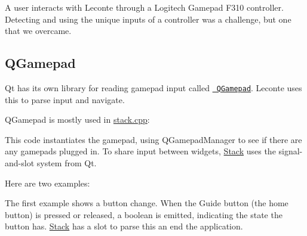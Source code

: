 A user interacts with Leconte through a Logitech Gamepad F310 controller. Detecting and using the unique inputs of a controller was a challenge, but one that we overcame.

\subsection*{Q\+Gamepad}

Qt has its own library for reading gamepad input called \href{https://doc.qt.io/qt-5/qgamepad.html}{\texttt{ Q\+Gamepad}}. Leconte uses this to parse input and navigate.

Q\+Gamepad is mostly used in {\ttfamily \mbox{\hyperlink{stack_8cpp}{stack.\+cpp}}}\+: 
\begin{DoxyCode}{0}
\DoxyCodeLine{\textcolor{preprocessor}{\#include <QtGamepad/QGamepad>}}
\DoxyCodeLine{    \textcolor{keywordflow}{return};}
\DoxyCodeLine{\}}
\end{DoxyCode}


This code instantiates the gamepad, using Q\+Gamepad\+Manager to see if there are any gamepads plugged in. To share input between widgets, \mbox{\hyperlink{classStack}{Stack}} uses the signal-\/and-\/slot system from Qt.

Here are two examples\+: 
\begin{DoxyCode}{0}
\end{DoxyCode}


The first example shows a button change. When the Guide button (the home button) is pressed or released, a boolean is emitted, indicating the state the button has. \mbox{\hyperlink{classStack}{Stack}} has a slot to parse this an end the application.


\begin{DoxyCode}{0}
\DoxyCodeLine{}
\DoxyCodeLine{    \}}
\DoxyCodeLine{\}}
\end{DoxyCode}


